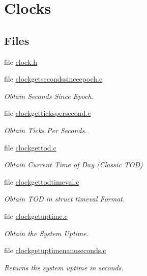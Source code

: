 \hypertarget{group__ClassicClock}{}\section{Clocks}
\label{group__ClassicClock}
\subsection*{Files}
\begin{DoxyCompactItemize}
\item 
file \mbox{\hyperlink{cpukit_2include_2rtems_2rtems_2clock_8h}{clock.\+h}}
\item 
file \mbox{\hyperlink{clockgetsecondssinceepoch_8c}{clockgetsecondssinceepoch.\+c}}
\begin{DoxyCompactList}\small\item\em Obtain Seconds Since Epoch. \end{DoxyCompactList}\item 
file \mbox{\hyperlink{clockgettickspersecond_8c}{clockgettickspersecond.\+c}}
\begin{DoxyCompactList}\small\item\em Obtain Ticks Per Seconds. \end{DoxyCompactList}\item 
file \mbox{\hyperlink{clockgettod_8c}{clockgettod.\+c}}
\begin{DoxyCompactList}\small\item\em Obtain Current Time of Day (Classic T\+OD) \end{DoxyCompactList}\item 
file \mbox{\hyperlink{clockgettodtimeval_8c}{clockgettodtimeval.\+c}}
\begin{DoxyCompactList}\small\item\em Obtain T\+OD in struct timeval Format. \end{DoxyCompactList}\item 
file \mbox{\hyperlink{clockgetuptime_8c}{clockgetuptime.\+c}}
\begin{DoxyCompactList}\small\item\em Obtain the System Uptime. \end{DoxyCompactList}\item 
file \mbox{\hyperlink{clockgetuptimenanoseconds_8c}{clockgetuptimenanoseconds.\+c}}
\begin{DoxyCompactList}\small\item\em Returns the system uptime in seconds. \end{DoxyCompactList}\item 

\end{DoxyCompactItemize}

